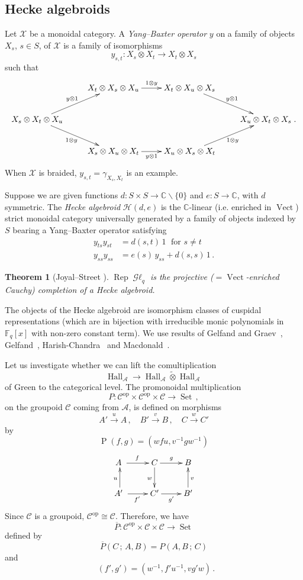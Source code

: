 \documentclass[a4paper,12pt]{article}
\newtheorem*{Theorem}{Theorem}%
\theoremstyle{definition}
\theoremstyle{fact}
\theoremstyle{genquest}
\theoremstyle{step}
\newcommand{\catA}{\mathcal{A}}
\newcommand{\catC}{\mathcal{C}}
\newcommand{\CC}{\mathbb{C}}
\newcommand{\FF}{\mathbb{F}}
\newcommand{\catGL}{\mathop{\mathcal{G}\ell}\nolimits}
\newcommand{\catH}{\mathcal{H}}
\newcommand{\Hall}{\operatorname{Hall}}
\newcommand{\Rep}{\operatorname{Rep}}
\newcommand{\Set}{\operatorname{Set}}
\newcommand{\Vect}{\operatorname{Vect}}
\newcommand{\catX}{\mathcal{X}}
\newcommand{\op}{\operatorname{op}}
\newcommand{\longto}{\longrightarrow}
\begin{document}
\subsection{Hecke algebroids}

Let $\catX$ be a monoidal category.  A \emph{Yang--Baxter operator} $y$ on a family of objects $X_s$, $s\in S$, of $\catX$ is a family of isomorphisms
\[
y_{s,t} : X_s \otimes X_t \to X_t \otimes X_s
\]
such that 
\[ \xymatrix{  
 & X_t \otimes X_s \otimes X_u  \ar[r]^-{1\otimes y} &  X_t \otimes X_u \otimes X_s \ar[rd]^-{y\otimes 1} \\
X_s \otimes X_t \otimes X_u \ar[ru]^-{y \otimes 1} \ar[rd]_-{1\otimes y} &&&  X_u \otimes X_t \otimes X_s\;. \\
 & X_s \otimes X_u \otimes X_t    \ar[r]_-{y\otimes 1} & X_u \otimes X_s \otimes X_t    \ar[ru]_-{1\otimes y} 
 }\]
When $\catX$ is braided, $y_{s,t} = \gamma^{}_{X_s,X_t}$ is an example.

Suppose we are given functions
$d : S \times S \to \CC \backslash \{0\}$ and  $e : S \to \CC$,
with $d$ symmetric. 
The \emph{Hecke algebroid} $\catH (d,e)$ is the $\CC$-linear (i.e. enriched in $\Vect $) strict monoidal category universally generated by a family of objects indexed by $S$ bearing a Yang--Baxter operator satisfying
\begin{align*}
y_{ts} y_{st} &= d(s,t) \,1 \;\text{ for } s \neq t
\\
y_{ss} y_{ss} &= e(s)\, y_{ss} + d(s,s) \,1\,.
\end{align*}

\begin{Theorem}[Joyal--Street \cite{GLFq}] 
$\Rep \catGL_q$ is the projective {\upshape(}$= \Vect $-enriched Cauchy{\upshape)} completion of a Hecke algebroid.
\end{Theorem}

The objects of the Hecke algebroid are isomorphism classes of cuspidal representations 
(which are in bijection with irreducible monic polynomials in $\FF_q[x]$ with non-zero constant term).  
We use results of Gelfand and Graev~\cite{GG1962}, Gelfand~\cite{Gel1970}, Harish-Chandra~\cite{H-C1970}
and Macdonald~\cite{Macdon1995}.


 Let us investigate whether we can lift the comultiplication
 \[
 \Hall_\catA \to \Hall_\catA \mathbin{\tilde{\otimes}} \Hall_\catA 
 \]
 of Green to the categorical level. The promonoidal multiplication
\[
P : \catC^{\op} \times \catC^{\op} \times \catC \to \Set\,,
\]
on the groupoid $\catC$ coming from $\catA$, is defined on morphisms
\[
A' \stackrel{u}{\longto} A \,, \quad 
B' \stackrel{v}{\longto} B \,, \quad 
C \stackrel{w}{\longto}  C'
\]
by
\[
\mathop{P(u,v\,;\,w)}(f,g) = (wfu,v^{-1}gw^{-1})
\]
\[
\xymatrix{
A \    \ar[r]^f &C \ar[d]_w \ar[r]^g &    B  \\
\ar[u]^u A' \ \ar[r]_{f'} &  C' \ar[r]_{g'} & B'  \ar[u]_v
 }\]
Since $\catC$ is a groupoid, $\catC^{\op} \cong \catC$.    
Therefore, we have 
\[
\overline P  : \catC^{\op} \times \catC \times \catC \to \Set 
\]
defined by
\[
\overline P (C\,;\,A,B) = P(A,B\,;\,C)
\]
and
\[
 \mathop{\overline P  (w\,;\,u,v)}(f',g') = (w^{-1},f'u^{-1},vg'w)\,.
\]
\end{document}
